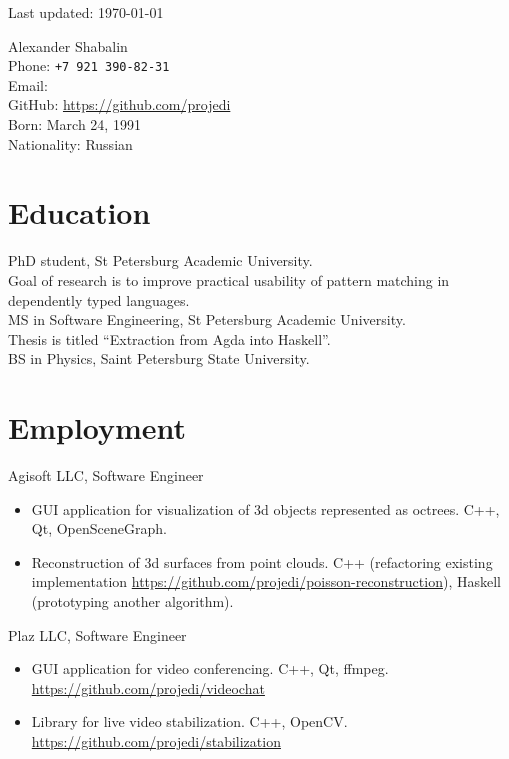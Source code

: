\thispagestyle{empty}

\begin{flushright}
\scriptsize Last updated: \today
\end{flushright}

{\LARGE Alexander Shabalin}\\[1cm]
Phone: \texttt{+7 921 390-82-31}\\
Email: \\
GitHub: \url{https://github.com/projedi}\\[.1cm]
Born: March 24, 1991\\
Nationality: Russian

\section*{Education}

   PhD student, St Petersburg Academic University.\\
   Goal of research is to improve practical usability of pattern matching
   in dependently typed languages.\\[.3cm]
   MS in Software Engineering, St Petersburg Academic University.\\
   Thesis is titled ``Extraction from Agda into Haskell''.\\[.3cm]
   BS in Physics, Saint Petersburg State University.

\section*{Employment}

   Agisoft LLC, Software Engineer
   \begin{itemize}
      \itemsep 0cm
      \item GUI application for visualization of 3d objects represented as octrees.
            C++, Qt, OpenSceneGraph.
      \item Reconstruction of 3d surfaces from point clouds.
            C++ (refactoring existing implementation
            \url{https://github.com/projedi/poisson-reconstruction}),
            Haskell (prototyping another algorithm).
   \end{itemize}
   Plaz LLC, Software Engineer
   \begin{itemize}
      \itemsep 0cm
      \item GUI application for video conferencing. C++, Qt, ffmpeg.\\
            \url{https://github.com/projedi/videochat}
      \item Library for live video stabilization. C++, OpenCV.\\
            \url{https://github.com/projedi/stabilization}
   \end{itemize}

